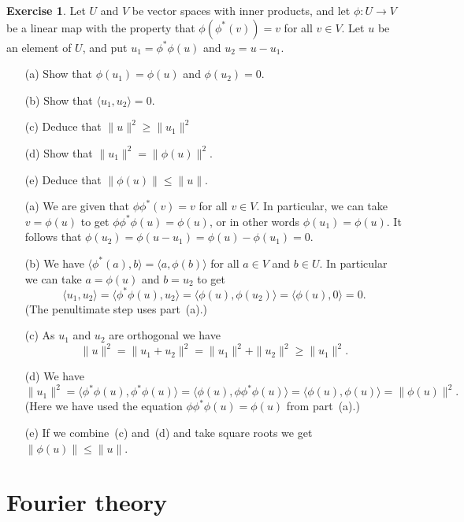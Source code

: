 \documentclass{amsart}
\newcommand{\ip}[1]     {\langle #1\rangle}
\renewcommand{\:}       {\colon}
\theoremstyle{definition}
\newtheorem{exercise}{Exercise}[section]
\renewenvironment{solution}{\SolutionAtEnd}{\endSolutionAtEnd}
\begin{document}
\begin{exercise}
 Let $U$ and $V$ be vector spaces with inner products, and
 let $\phi\:U\to V$ be a linear map with the property that
 $\phi(\phi^*(v))=v$ for all $v\in V$.  Let $u$ be an
 element of $U$, and put $u_1=\phi^*\phi(u)$ and $u_2=u-u_1$.
 \begin{itemize}
  \item[(a)] Show that $\phi(u_1)=\phi(u)$ and $\phi(u_2)=0$. 
  \item[(b)] Show that $\ip{u_1,u_2}=0$.
  \item[(c)] Deduce that $\|u\|^2\geq\|u_1\|^2$
  \item[(d)] Show that $\|u_1\|^2=\|\phi(u)\|^2$.
  \item[(e)] Deduce that $\|\phi(u)\|\leq\|u\|$.
 \end{itemize}
\end{exercise}
\begin{solution}
 \begin{itemize}
  \item[(a)] We are given that $\phi\phi^*(v)=v$ for all
   $v\in V$.  In particular, we can take $v=\phi(u)$ to get
   $\phi\phi^*\phi(u)=\phi(u)$, or in other words
   $\phi(u_1)=\phi(u)$.  It follows that
   $\phi(u_2)=\phi(u-u_1)=\phi(u)-\phi(u_1)=0$. 
  \item[(b)] We have $\ip{\phi^*(a),b}=\ip{a,\phi(b)}$ for
   all $a\in V$ and $b\in U$.  In particular we can take
   $a=\phi(u)$ and $b=u_2$ to get 
   \[ \ip{u_1,u_2} = \ip{\phi^*\phi(u),u_2} = 
      \ip{\phi(u),\phi(u_2)} = 
      \ip{\phi(u),0} = 0.
   \]
   (The penultimate step uses part~(a).)
  \item[(c)] As $u_1$ and $u_2$ are orthogonal we have
   \[ \|u\|^2 = \|u_1+u_2\|^2 = \|u_1\|^2 + \|u_2\|^2 \geq 
       \|u_1\|^2.
   \]
  \item[(d)] We have
   \[ \|u_1\|^2 = \ip{\phi^*\phi(u),\phi^*\phi(u)} = 
       \ip{\phi(u),\phi\phi^*\phi(u)} = \ip{\phi(u),\phi(u)}
       = \|\phi(u)\|^2.
   \]
   (Here we have used the equation
   $\phi\phi^*\phi(u)=\phi(u)$ from part~(a).)
  \item[(e)] If we combine~(c) and~(d) and take square roots
   we get $\|\phi(u)\|\leq\|u\|$.
 \end{itemize}
\end{solution}


\section{Fourier theory}
\label{sec-fourier}
\end{document}
